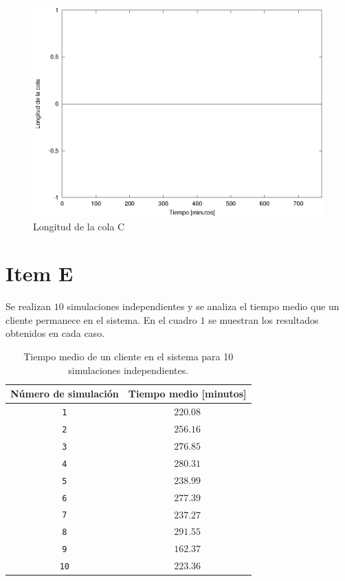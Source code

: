 \documentclass[a4paper,10pt]{article}
\begin{document}
\begin{figure}[hp]
\centering
\includegraphics{graficos/plot_longitud_C.eps}
\caption{Longitud de la cola C}
\label{fig:colaC}
\end{figure}

\section*{Item E}

%
%

Se realizan $10$ simulaciones independientes y se analiza el tiempo medio
que un cliente permanece en el sistema. En el cuadro $1$
se muestran los resultados obtenidos en cada caso.

\begin{table}
\begin{center}
\begin{tabular}{cc} \hline \hline
N\'umero de simulaci\'on & Tiempo medio [minutos] \\ \hline
\texttt{1}	& $220.08$ \\
\texttt{2}	& $256.16$ \\
\texttt{3}	& $276.85$ \\
\texttt{4}	& $280.31$ \\
\texttt{5}	& $238.99$ \\
\texttt{6}	& $277.39$ \\
\texttt{7}	& $237.27$ \\
\texttt{8}	& $291.55$ \\
\texttt{9}	& $162.37$ \\
\texttt{10}	& $223.36$ \\
\hline \hline
\end{tabular}
\end{center}
\label{tab:tiemposmedios}
\vspace{4pt}
\caption{Tiempo medio de un cliente en el sistema para 10 simulaciones
independientes.}
\end{table}
\end{document}
